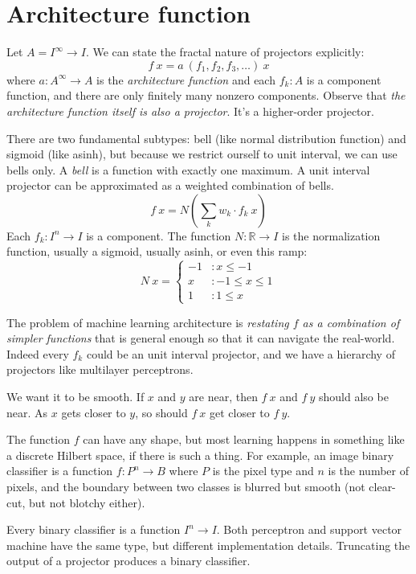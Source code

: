 \section{Architecture function}

Let \(A = I^\infty \to I\).
We can state the fractal nature of projectors explicitly:
\[
    f~x = a~(f_1,f_2,f_3,\ldots)~x
\]
where \(a : A^\infty \to A\) is the \emph{architecture function}
and each \(f_k : A\) is a component function,
and there are only finitely many nonzero components.
Observe that \emph{the architecture function itself is also a projector}.
It's a higher-order projector.

There are two fundamental subtypes:
bell (like normal distribution function) and sigmoid (like asinh),
but because we restrict ourself to unit interval,
we can use bells only.
A \emph{bell} is a function with exactly one maximum.
A unit interval projector can be approximated as a weighted combination of bells.
\[
    f~x = N \left( \sum_k w_k \cdot f_k~x \right)
\]
Each \(f_k : I^n \to I\) is a component.
The function \(N : \mathbb{R} \to I\) is the normalization function,
usually a sigmoid, usually asinh,
or even this ramp:
\[
    N~x =
    \begin{cases}
        -1 & : x \le -1
        \\
        x & : -1 \le x \le 1
        \\
        1 & : 1 \le x
    \end{cases}
\]

The problem of machine learning architecture
is \emph{restating \(f\) as a combination of simpler functions}
that is general enough so that it can navigate the real-world.
Indeed every \(f_k\) could be an unit interval projector,
and we have a hierarchy of projectors
like multilayer perceptrons.

We want it to be smooth.
If \(x\) and \(y\) are near,
then \(f~x\) and \(f~y\) should also be near.
As \(x\) gets closer to \(y\), so should \(f~x\) get closer to \(f~y\).

The function \(f\) can have any shape,
but most learning happens in something like a discrete Hilbert space, if there is such a thing.
For example, an image binary classifier is a function \(f : P^n \to B\)
where \(P\) is the pixel type and \(n\) is the number of pixels,
and the boundary between two classes is blurred but smooth
(not clear-cut, but not blotchy either).

Every binary classifier is a function \(I^n \to I\).
Both perceptron and support vector machine have the same type,
but different implementation details.
Truncating the output of a projector produces a binary classifier.


